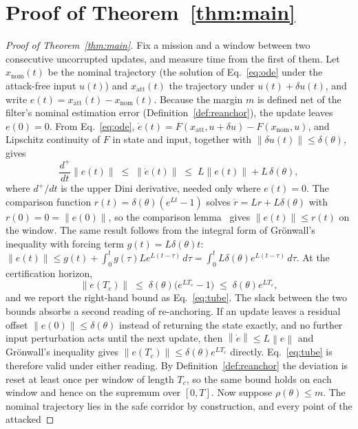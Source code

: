 \documentclass[conference,letterpaper,10pt]{IEEEtran}   %
\newcommand{\Norm}[1]{\left\lVert #1\right\rVert}
\begin{document}
\section{Proof of Theorem~\ref{thm:main}}
\label{app:proof}
\begin{proof}[Proof of Theorem~\ref{thm:main}]
Fix a mission and a window between two consecutive uncorrupted updates, and
measure time from the first of them. Let $x_{\mathrm{nom}}(t)$ be the nominal
trajectory (the solution of Eq.~\eqref{eq:ode} under the attack-free input
$u(t)$) and $x_{\mathrm{att}}(t)$ the trajectory under $u(t)+\delta u(t)$, and
write $e(t)=x_{\mathrm{att}}(t)-x_{\mathrm{nom}}(t)$. Because the margin $m$ is
defined net of the filter's nominal estimation error
(Definition~\ref{def:reanchor}), the update leaves $e(0)=0$. From
Eq.~\eqref{eq:ode},
$\dot e(t)=F(x_{\mathrm{att}},u+\delta u)-F(x_{\mathrm{nom}},u)$, and
Lipschitz continuity of $F$ in state and input, together with
$\Norm{\delta u(t)}\le\delta(\theta)$, gives
\[
\frac{d^{+}}{dt}\Norm{e(t)}\;\le\;\Norm{\dot e(t)}\;\le\;L\Norm{e(t)}+L\,\delta(\theta),
\]
where $d^{+}/dt$ is the upper Dini derivative, needed only where $e(t)=0$. The
comparison function $r(t)=\delta(\theta)(e^{Lt}-1)$ solves
$\dot r=Lr+L\delta(\theta)$ with $r(0)=0=\Norm{e(0)}$, so the comparison
lemma~\cite{gronwall1919} gives $\Norm{e(t)}\le r(t)$ on the window. The same
result follows from the integral form of Gr\"onwall's inequality with forcing
term $g(t)=L\delta(\theta)t$:
$\Norm{e(t)}\le g(t)+\int_0^t g(\tau)Le^{L(t-\tau)}\,d\tau
=\int_0^t L\delta(\theta)e^{L(t-\tau)}\,d\tau$. At the certification horizon,
\begin{equation}
\label{eq:tube_derivation}
\Norm{e(T_c)}\;\le\;\delta(\theta)\big(e^{LT_c}-1\big)\;\le\;\delta(\theta)e^{LT_c},
\end{equation}
and we report the right-hand bound as Eq.~\eqref{eq:tube}. The slack between the
two bounds absorbs a second reading of re-anchoring. If an update leaves a
residual offset $\Norm{e(0)}\le\delta(\theta)$ instead of returning the state
exactly, and no further input perturbation acts until the next update, then
$\Norm{\dot e}\le L\Norm{e}$ and Gr\"onwall's inequality gives
$\Norm{e(T_c)}\le\delta(\theta)e^{LT_c}$ directly. Eq.~\eqref{eq:tube} is
therefore valid under either reading. By
Definition~\ref{def:reanchor} the deviation is reset at least once per window of
length $T_c$, so the same bound holds on each window and hence on the
supremum over $[0,T]$. Now suppose $\rho(\theta)\le m$. The nominal trajectory
lies in the safe corridor by construction, and every point of the attacked

\end{proof}
\end{document}
